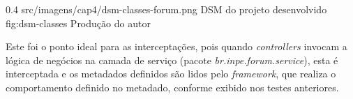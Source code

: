 \begin{image}
{0.4}
{src/imagens/cap4/dsm-classes-forum.png}
{DSM do projeto desenvolvido}
{fig:dsm-classes}
{Produção do autor}
\end{image}

\par Este foi o ponto ideal para as interceptações, pois quando \textit{controllers} invocam a lógica de negócios na camada de serviço (pacote \textit{br.inpe.forum.service}), esta é interceptada e os metadados definidos são lidos pelo \textit{framework}, que realiza o comportamento definido no metadado, conforme exibido nos testes anteriores.